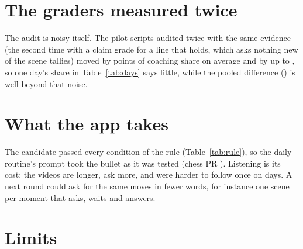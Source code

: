 \documentclass[11pt]{article}
\begin{document}
\section{The graders measured twice}

The audit is noisy itself. The \RetestN{} pilot scripts audited twice with the same evidence (the
second time with a claim grade for a line that holds, which asks nothing new of the scene tallies)
moved by \RetestShare{} points of coaching share on average and by up to \RetestMax, so one day's
share in Table~\ref{tab:days} says little, while the pooled difference (\ShareDiff) is well beyond
that noise.

\begin{table}[h]
\centering
\scriptsize\DayTable
\caption{Each day: the judge's verdict from the candidate's side ($+$ a win, $-$ a loss, $0$ a
tie), the candidate's length over today's heard once, and the share of the coaching moves the audit
finds in the moment scenes.}
\label{tab:days}
\end{table}

\section{What the app takes}

The candidate passed every condition of the rule (Table~\ref{tab:rule}), so the daily routine's
prompt took the bullet as it was tested (chess PR \PortPR). Listening is its cost: the videos are
longer, ask more, and were harder to follow once on \ListeningLosses{} days. A next round could ask
for the same moves in fewer words, for instance one scene per moment that asks, waits and answers.

\section{Limits}
\end{document}

